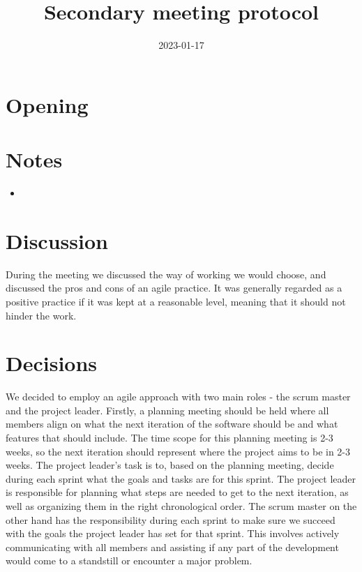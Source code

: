 \documentclass{article}
\newcommand{\meetingdate}{2023-01-17}
\newcommand{\meetingtime}{15:00}
\newcommand{\meetingtitle}{Secondary meeting protocol}
\newcommand{\attendees}{\members}
\begin{document}
    \begin{titlepage}
        \title{\meetingtitle}
        \date{\meetingdate}
        \maketitle
        
        \thispagestyle{first}
        
        \timeanddate{\meetingdate \space \meetingtime}
        \called{\members}
        \attended{\attendees}
    \end{titlepage}
    \newpage
    \pagestyle{fancy}

    \section{Opening}
        

    \section{Notes}
        \begin{itemize}
            \item 
        \end{itemize}

    \section{Discussion}
        During the meeting we discussed the way of working we would choose, and discussed the pros and cons of an agile practice. It was generally regarded as a positive practice if it was kept at a reasonable level, meaning that it should not hinder the work. 

    \section{Decisions}
        We decided to employ an agile approach with two main roles - the scrum master and the project leader. Firstly, a planning meeting should be held where all members align on what the next iteration of the software should be and what features that should include. The time scope for this planning meeting is 2-3 weeks, so the next iteration should represent where the project aims to be in 2-3 weeks. The project leader's task is to, based on the planning meeting, decide during each sprint what the goals and tasks are for this sprint. The project leader is responsible for planning what steps are needed to get to the next iteration, as well as organizing them in the right chronological order. The scrum master on the other hand has the responsibility during each sprint to make sure we succeed with the goals the project leader has set for that sprint. This involves actively communicating with all members and assisting if any part of the development would come to a standstill or encounter a major problem.
\end{document}

